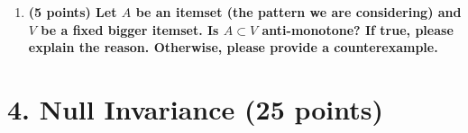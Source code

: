 \documentclass[12pt]{article}
\begin{document}
\begin{enumerate}[label=(\alph*)]
\begin{enumerate}[label=\roman*.]
        
    \end{enumerate}

    \vspace{2em}

    \item \textbf{(5 points) Let $A$ be an itemset (the pattern we are considering) and $V$ be a fixed bigger itemset. Is $A \subset V$ anti-monotone? If true, please explain the reason. Otherwise, please provide a counterexample.}
    \\
    
    
\end{enumerate}

\newpage
\section*{4. Null Invariance (25 points)}
\end{document}
